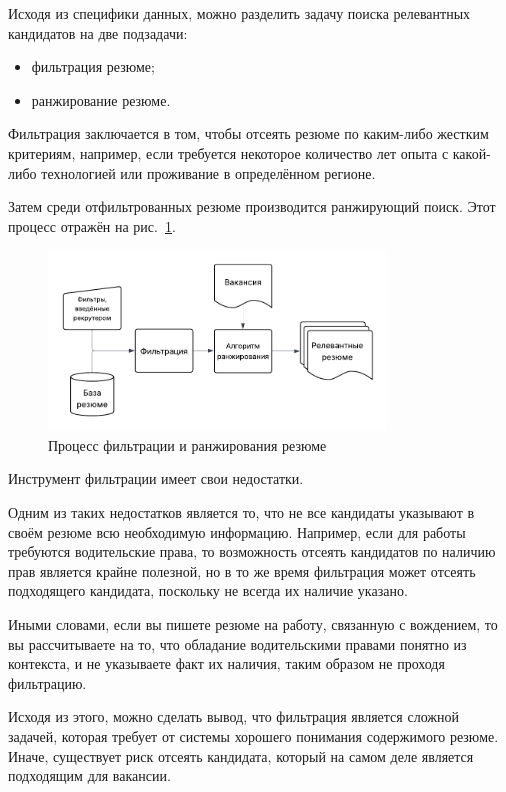 \documentclass[14pt]{mmcs_article}
\begin{document}
Исходя из специфики данных, можно разделить задачу поиска релевантных кандидатов на две подзадачи:

\begin{itemize}
  \item фильтрация резюме;
  \item ранжирование резюме.
\end{itemize}

Фильтрация заключается в том, чтобы отсеять резюме по каким-либо жестким критериям, например, если требуется некоторое количество лет опыта с какой-либо технологией или проживание в определённом регионе.

Затем среди отфильтрованных резюме производится ранжирующий поиск. Этот процесс отражён на рис.~\ref{fig:filtering_and_ranking}.

\begin{figure}[h]
  \centering
  \includegraphics[width=0.8\textwidth]{plots/filtering_and_ranking.pdf}
  \caption{\centering Процесс фильтрации и ранжирования резюме}
  \label{fig:filtering_and_ranking}
\end{figure}

Инструмент фильтрации имеет свои недостатки.

Одним из таких недостатков является то, что не все кандидаты указывают в своём резюме всю необходимую информацию. Например, если для работы требуются водительские права, то возможность отсеять кандидатов по наличию прав является крайне полезной, но в то же время фильтрация может отсеять подходящего кандидата, поскольку не всегда их наличие указано.

Иными словами, если вы пишете резюме на работу, связанную с вождением, то вы рассчитываете на то, что обладание водительскими правами понятно из контекста, и не указываете факт их наличия, таким образом не проходя фильтрацию.

Исходя из этого, можно сделать вывод, что фильтрация является сложной задачей, которая требует от системы хорошего понимания содержимого резюме. Иначе, существует риск отсеять кандидата, который на самом деле является подходящим для вакансии.
\end{document}
